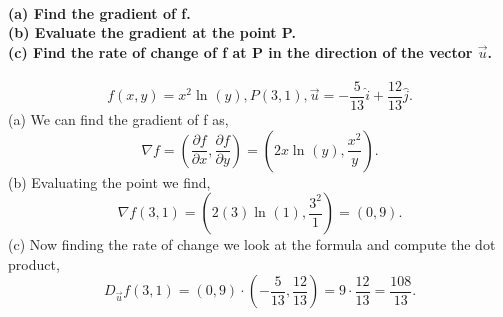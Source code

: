  \paragraph{(a) Find the gradient of f. \\(b) Evaluate the gradient at the point P.\\(c) Find the rate of change of f at P in the direction of the vector $ \vec{ u } $.}
\[
f\left( x,y \right) =x^2 \ln^{  } \left( y \right),P\left( 3,1 \right) ,\vec{ u }=-\frac{ 5 }{ 13 } \hat{ i }+\frac{ 12 }{ 13 } \hat{ j }
.\] 
(a) We can find the gradient of f as,
\[
\nabla f=\left( \frac{ \partial f}{\partial x} , \frac{ \partial f}{\partial y}  \right) = \left( 2x\ln^{  } \left( y \right) , \frac{ x^2 }{ y } \right) 
.\] 
(b) Evaluating the point we find,
\[
\nabla f\left( 3,1 \right) = \left( 2\left( 3 \right) \ln^{  } \left( 1 \right) , \frac{ 3^2 }{ 1 } \right) = \left( 0,9 \right) 
.\] 
(c) Now finding the rate of change we look at the formula and compute the dot product,
\[
D_{ \vec{ u } }f\left( 3,1 \right) = \left( 0,9 \right) \cdot \left( -\frac{ 5 }{ 13 } ,\frac{ 12 }{ 13 }  \right) = 9 \cdot \frac{ 12 }{ 13 } = \frac{ 108 }{ 13 } 
.\]
